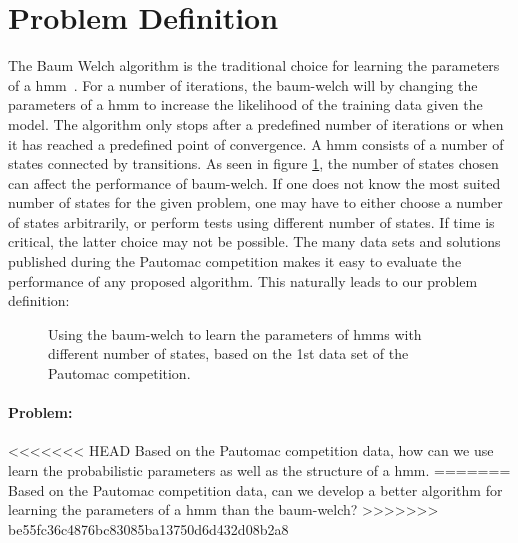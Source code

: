 \section{Problem Definition}

The Baum Welch algorithm is the traditional choice for learning the parameters of a \gls{hmm}~\cite{pautomacTR}. 
For a number of iterations, the \gls{baum-welch} will by changing the parameters of a \gls{hmm} to increase the likelihood of the training data given the model. The algorithm only stops after a predefined number of iterations or when it has reached a predefined point of convergence.
A \gls{hmm} consists of a number of states connected by transitions. As seen in figure \ref{fig:bw-states-are-important}, the number of states chosen can affect the performance of \gls{baum-welch}. If one does not know the most suited number of states for the given problem, one may have to either choose a number of states arbitrarily, or perform tests using different number of states. If time is critical, the latter choice may not be possible.
The many data sets and solutions published during the Pautomac competition makes it easy to evaluate the performance of any proposed algorithm.
This naturally leads to our problem definition:

\begin{figure}
\begin{centering}
\caption{Using the \gls{baum-welch} to learn the parameters of \gls{hmm}s with different number of states, based on the 1st data set of the Pautomac competition.}
\label{fig:bw-states-are-important} 
\end{centering}
\end{figure}


\paragraph{Problem:}

<<<<<<< HEAD
Based on the Pautomac competition data, how can we use learn the probabilistic parameters as well as the structure of a \gls{hmm}.
=======
Based on the Pautomac competition data, can we develop a better algorithm for learning the parameters of a \gls{hmm} than the \gls{baum-welch}?
>>>>>>> be55fc36c4876bc83085ba13750d6d432d08b2a8
